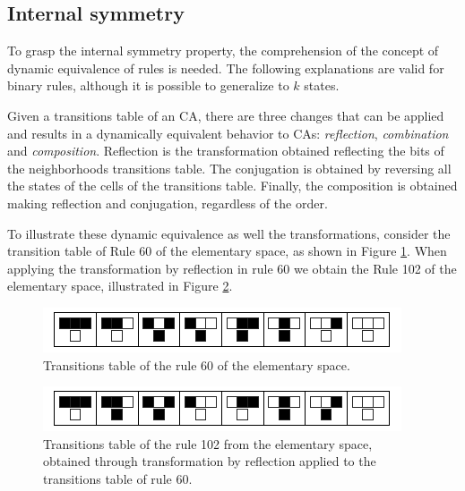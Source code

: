 \documentclass{llncs}
\begin{document}
\subsection{Internal symmetry}
To grasp the internal symmetry property, the comprehension of the concept of dynamic equivalence of rules is needed. The following explanations are valid for binary rules, although it is possible to generalize to $k$ states.

Given a transitions table of an CA, there are three changes that can be applied and results in a dynamically equivalent behavior to CAs: \textit{reflection}, \textit{combination} and \textit{composition}. Reflection is the transformation obtained reflecting the bits of the neighborhoods transitions table. The conjugation is obtained by reversing all the states of the cells of the transitions table. Finally, the composition is obtained making reflection and conjugation, regardless of the order.

To illustrate these dynamic equivalence as well the transformations, consider the transition table of Rule 60 of the elementary space, as shown in Figure \ref{fig:table60}. When applying the transformation by reflection in rule 60 we obtain the Rule 102 of the elementary space, illustrated in Figure \ref{fig:table102}.

  \begin{figure}[h!]
    \centering
    \includegraphics[width=.5\textwidth]{fig_ruleIcon60.png}
    \caption{Transitions table of the rule 60 of the elementary space.}
    \label{fig:table60}
  \end{figure}

  \begin{figure}[h!]
    \centering
    \includegraphics[width=.5\textwidth]{fig_ruleIcon102.png}
    \caption{Transitions table of the rule 102 from the elementary space, obtained through transformation by reflection applied to the transitions table of rule 60.}
    \label{fig:table102}
  \end{figure}

\end{document}
